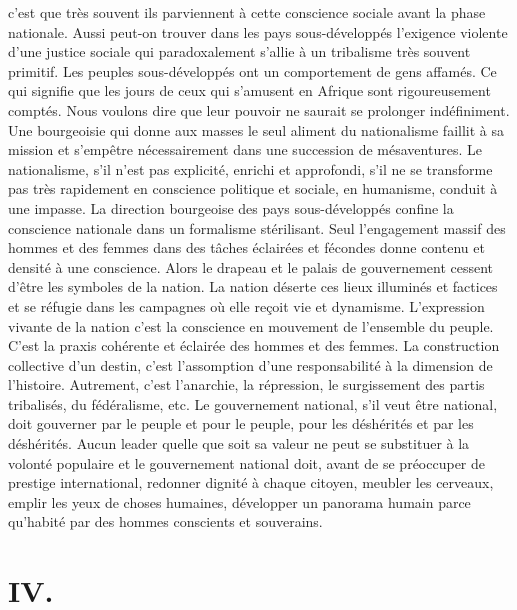 \documentclass[french,twoside]{book} %
\newcommand\chapteropen{} %
\newcommand\chaptercont{} %
\newcommand\chapterclose{} %
\begin{document}
c’est que très souvent ils parviennent à cette conscience sociale avant la phase nationale. Aussi peut-on trouver dans les pays sous-développés l’exigence violente d’une justice sociale qui paradoxalement s’allie à un tribalisme très souvent primitif. Les peuples sous-développés ont un comportement de gens affamés. Ce qui signifie que les jours de ceux qui s’amusent en Afrique sont rigoureusement comptés. Nous voulons dire que leur pouvoir ne saurait se prolonger indéfiniment. Une bourgeoisie qui donne aux masses le seul aliment du nationalisme faillit à sa mission et s’empêtre nécessairement dans une succession de mésaventures. Le nationalisme, s’il n’est pas explicité, enrichi et approfondi, s’il ne se transforme pas très rapidement en conscience politique et sociale, en humanisme, conduit à une impasse. La direction bourgeoise des pays sous-développés confine la conscience nationale dans un formalisme stérilisant. Seul l’engagement massif des hommes et des femmes dans des tâches éclairées et fécondes donne contenu et densité à une conscience. Alors le drapeau et le palais de gouvernement cessent d’être les symboles de la nation. La nation déserte ces lieux illuminés et factices et se réfugie dans les campagnes où elle reçoit vie et dynamisme. L’expression vivante de la nation c’est la conscience en mouvement de l’ensemble du peuple. C’est la praxis cohérente et éclairée des hommes et des femmes. La construction collective d’un destin, c’est l’assomption d’une responsabilité à la dimension de l’histoire. Autrement, c’est l’anarchie, la répression, le surgissement des partis tribalisés, du fédéralisme, etc. Le gouvernement national, s’il veut être national, doit gouverner par le peuple et pour le peuple, pour les déshérités et par les déshérités. Aucun leader quelle que soit sa valeur ne peut se substituer à la volonté populaire et le gouvernement national doit, avant de se préoccuper de prestige international, redonner dignité à chaque citoyen, meubler les cerveaux, emplir les yeux de choses humaines, développer un panorama humain parce qu’habité par des hommes conscients et souverains.\par
 \chapterclose


\chapteropen
\chapter[{IV.}]{IV.}\renewcommand{\leftmark}{IV.}

 
\chaptercont
\end{document}
